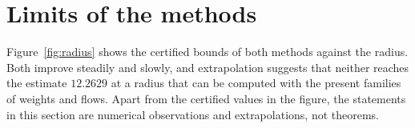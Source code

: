 \section{Limits of the methods}\label{sec:limits}

Figure~\ref{fig:radius} shows the certified bounds of both methods against the radius. Both improve steadily and
slowly, and extrapolation suggests that neither reaches the estimate $12.2629$ at a radius that can be computed with
the present families of weights and flows. Apart from the certified values in the figure, the statements in this
section are numerical observations and extrapolations, not theorems.

